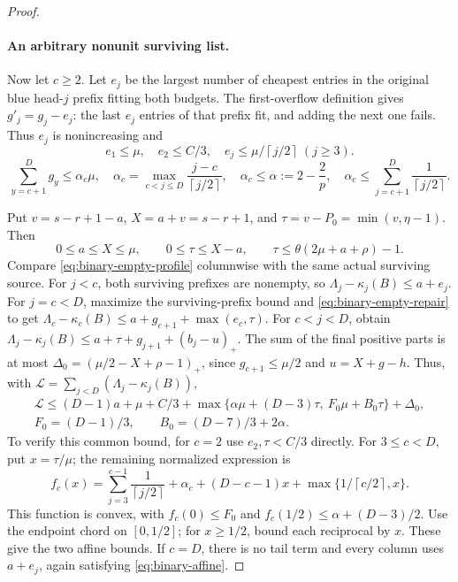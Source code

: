 \documentclass[11pt,a4paper]{article}
\newcommand{\ceil}[1]{\left\lceil#1\right\rceil}
\theoremstyle{definition}
\begin{document}
\begin{proof}
\paragraph{An arbitrary nonunit surviving list.}
Now let $c\ge2$.
Let $e_j$ be the largest number of cheapest entries in the original blue head-$j$ prefix fitting both budgets.
The first-overflow definition gives $g'_j=g_j-e_j$: the last $e_j$ entries of that prefix fit, and adding the next one fails.
Thus $e_j$ is nonincreasing and
\[
 e_1\le\mu,\quad e_2\le C/3,\quad e_j\le\mu/\ceil{j/2}\ (j\ge3).
\]
\[
 \sum_{y=c+1}^Dg_y\le\alpha_c\mu,\quad
 \alpha_c=\max_{c<j\le D}\frac{j-c}{\ceil{j/2}},\quad
 \alpha_c\le\alpha:=2-\frac2p,\quad
 \alpha_c\le\sum_{j=c+1}^{D}\frac1{\ceil{j/2}}.
\]

Put $v=s-r+1-a$, $X=a+v=s-r+1$, and $\tau=v-P_0=\min(v,\eta-1)$. Then
\[
0\le a\le X\le\mu,\qquad
0\le\tau\le X-a,\qquad
\tau\le\theta(2\mu+a+\rho)-1.
\]
Compare \eqref{eq:binary-empty-profile} columnwise with the same actual surviving source.
For $j<c$, both surviving prefixes are nonempty, so
$\Lambda_j-\kappa_j(B)\le a+e_j$.
For $j=c<D$, maximize the surviving-prefix bound and \eqref{eq:binary-empty-repair} to get
$\Lambda_c-\kappa_c(B)\le a+g_{c+1}+\max(e_c,\tau)$.
For $c<j<D$, obtain
$\Lambda_j-\kappa_j(B)\le a+\tau+g_{j+1}+(b_j-u)_+$.
The sum of the final positive parts is at most
$\Delta_0=(\mu/2-X+\rho-1)_+$, since $g_{c+1}\le\mu/2$ and $u=X+g-h$.
Thus, with $\mathcal L=\sum_{j<D}(\Lambda_j-\kappa_j(B))$,
\begin{equation}\label{eq:binary-affine}
\begin{gathered}
\mathcal L\le(D-1)a+\mu+C/3+
\max\{\alpha\mu+(D-3)\tau,\ F_0\mu+B_0\tau\}+\Delta_0,\\
F_0=(D-1)/3,\qquad B_0=(D-7)/3+2\alpha .
\end{gathered}
\end{equation}
To verify this common bound, for $c=2$ use $e_2,\tau<C/3$ directly.
For $3\le c<D$, put $x=\tau/\mu$; the remaining normalized expression is
\[
 f_c(x)=\sum_{j=3}^{c-1}\frac1{\ceil{j/2}}+\alpha_c+
 (D-c-1)x+\max\{1/\ceil{c/2},x\}.
\]
This function is convex, with $f_c(0)\le F_0$ and $f_c(1/2)\le\alpha+(D-3)/2$.
Use the endpoint chord on $[0,1/2]$; for $x\ge1/2$, bound each reciprocal by $x$.
These give the two affine bounds.
If $c=D$, there is no tail term and every column uses $a+e_j$, again satisfying \eqref{eq:binary-affine}.


\end{proof}
\end{document}
